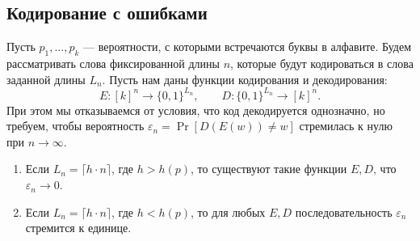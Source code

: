 


\thispagestyle{empty}


\subsection*{Кодирование с ошибками}

Пусть $ p_1,\dots,p_k $ --- вероятности, с которыми встречаются буквы в алфавите. Будем рассматривать слова фиксированной длины $n$, которые будут кодироваться в слова заданной длины $ L_n $. Пусть нам даны функции кодирования и декодирования: 
$$ E\colon [k]^n\to\{0,1\}^{L_n},\qquad D\colon\{0,1\}^{L_n}\to[k]^n. $$
При этом мы отказываемся от условия, что код декодируется однозначно, но требуем, чтобы вероятность $ 
\varepsilon_n = \Pr[D(E(w))\ne w] $ стремилась к нулю при $ n\to\infty $.
\begin{theorem}[Шеннон]
    \begin{enumerate}
        \item Если $ L_n=\lceil h\cdot n\rceil $, где $ h>h(p) $, то существуют такие функции $ E, D$, что $\varepsilon_n \to 0$.
        \item Если $ L_n=\lceil h\cdot n\rceil $, где $ h<h(p) $, то для любых $ E,D $ последовательность $ \varepsilon_n $ стремится к единице. 
    \end{enumerate}
\end{theorem}
